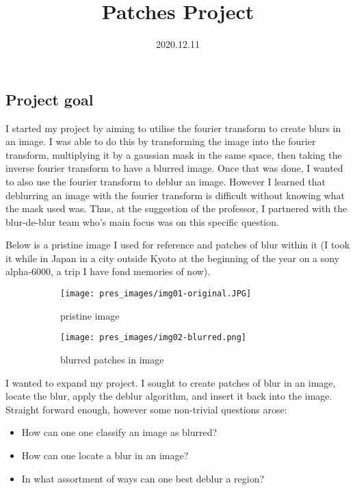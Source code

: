 \documentclass[11pt]{article}
\author{}
\date{2020.12.11}
\title{\vspace{-1cm}Patches Project}
\begin{document}
\maketitle
\vspace{-2cm}
\thispagestyle{fancy}

\subsection*{Project goal}

I started my project by aiming to utilise the fourier transform to create
blurs in an image. I was able to do this by transforming the image into the
fourier transform, multiplying it by a gaussian mask in the same space, then
taking the inverse fourier transform to have a blurred image. Once that was
done, I wanted to also use the fourier
transform to deblur an image. However I learned that deblurring an image
with the fourier transform is difficult without knowing what the mask
used was. Thus, at the suggestion of the professor, I partnered with
the blur-de-blur team who's main focus was on this specific question.

Below is a pristine image I used for reference and patches of blur within it
(I took it while in Japan in a city outside Kyoto at the beginning of the year
on a sony alpha-6000, a trip I have fond memories of now).

\begin{figure}[!ht]
  \centering
  \begin{subfigure}[b]{0.45\textwidth}
    \centering
    \texttt{[image: pres\_images/img01-original.JPG]}
    \caption{pristine image}
  \end{subfigure}
  \hfill
  \begin{subfigure}[b]{0.45\textwidth}
    \centering
    \texttt{[image: pres\_images/img02-blurred.png]}
    \caption{blurred patches in image}
  \end{subfigure}
  
  \caption{}
  \label{fig:1}
\end{figure}


I wanted to expand my project. I sought to create patches of blur in an image,
locate the blur, apply the deblur algorithm, and insert it back into the image.
Straight forward enough, however some non-trivial questions arose:

\begin{itemize}
    \item How can one one classify an image as blurred? 
    \item How can one locate a blur in an image?
    \item In what assortment of ways can one best deblur a region?
\end{itemize}
\end{document}
